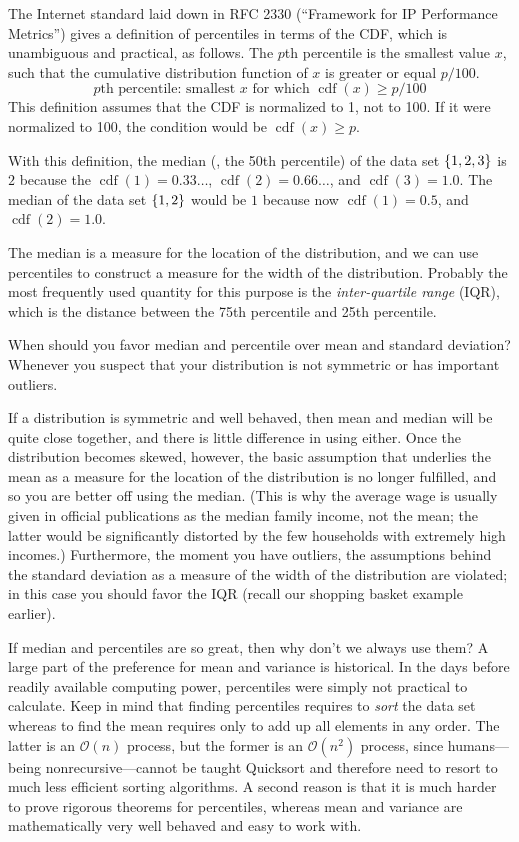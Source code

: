 The Internet standard laid down in RFC 2330 (``Framework for IP
Performance Metrics'') gives a definition of percentiles in terms of
the CDF, which is unambiguous and practical, as follows.  The $p$th
percentile is the smallest value $x$, such that the cumulative
distribution function of $x$ is greater or equal $p/100$.
\[
\text{$p$th percentile: smallest $x$ for which }
\operatorname{cdf}(x) \ge p/100
\]
This definition assumes that the CDF is normalized to 1,
not to 100. If it were normalized to 100, the condition would be
$\operatorname{cdf}(x) \ge p$.

With this definition, the median (\ie, the 50th percentile) of the
data set $\left\{ 1,2,3 \right\} $ is $2$ because the $\operatorname{cdf}(1) =
0.33\dots$, $\operatorname{cdf}(2) = 0.66\dots$, and
$\operatorname{cdf}(3) = 1.0$.  The median of the data set
$\left\{ 1,2 \right\} $ would be $1$ because now $\operatorname{cdf}(1) = 0.5$,
and $\operatorname{cdf}(2) = 1.0$.

The median is a measure for the location of the distribution, and we
can use percentiles to construct a measure for the width of the
distribution. Probably the most frequently used quantity for this
purpose is the \emph{inter-quartile range} (IQR), which is the
distance between the 75th percentile and 25th percentile.

When should you favor median and percentile over mean and standard
deviation? Whenever you suspect that your distribution is not
symmetric or has important outliers.

If a distribution is symmetric and well behaved, then mean and median
will be quite close together, and there is little difference in using
either. Once the distribution becomes skewed, however, the basic
assumption that underlies the mean as a measure for the location of
the distribution is no longer fulfilled, and so you are better off
using the median. (This is why the average wage is usually given in
official publications as the median family income, not the mean; the
latter would be significantly distorted by the few households with
extremely high incomes.) Furthermore, the moment you have outliers,
the assumptions behind the standard deviation as a measure of the
width of the distribution are violated; in this case you should favor
the IQR (recall our shopping basket example earlier).

If median and percentiles are so great, then why don't we always use
them?  A large part of the preference for mean and variance is
historical. In the days before readily available computing power,
percentiles were simply not practical to calculate. Keep in mind that
finding percentiles requires to \emph{sort} the data set whereas to
find the mean requires only to add up all elements in any order. The
latter is an $\mathcal{O}(n)$ process, but the former is an
$\mathcal{O}(n^2)$ process, since humans---being nonrecursive---cannot
be taught Quicksort and therefore need to resort to much less
efficient sorting algorithms. A second reason is that it is much harder
to prove rigorous theorems for percentiles, whereas mean and variance
are mathematically very well behaved and easy to work with.

